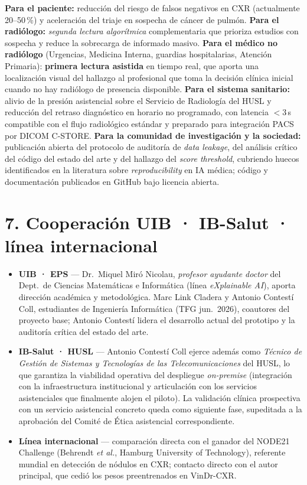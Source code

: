 \documentclass[11pt,a4paper]{article}
\begin{document}
\textbf{Para el paciente:} reducción del riesgo de falsos negativos en CXR (actualmente 20--50\,\%) y aceleración del triaje en sospecha de cáncer de pulmón. \textbf{Para el radiólogo:} \emph{segunda lectura algorítmica} complementaria que prioriza estudios con sospecha y reduce la sobrecarga de informado masivo. \textbf{Para el médico no radiólogo} (Urgencias, Medicina Interna, guardias hospitalarias, Atención Primaria): \textbf{primera lectura asistida} en tiempo real, que aporta una localización visual del hallazgo al profesional que toma la decisión clínica inicial cuando no hay radiólogo de presencia disponible. \textbf{Para el sistema sanitario:} alivio de la presión asistencial sobre el Servicio de Radiología del HUSL y reducción del retraso diagnóstico en horario no programado, con latencia $<$3\,s compatible con el flujo radiológico estándar y preparado para integración PACS por DICOM C-STORE. \textbf{Para la comunidad de investigación y la sociedad:} publicación abierta del protocolo de auditoría de \emph{data leakage}, del análisis crítico del código del estado del arte y del hallazgo del \emph{score threshold}, cubriendo huecos identificados en la literatura sobre \emph{reproducibility} en IA médica; código y documentación publicados en GitHub bajo licencia abierta.

\section*{7. Cooperación UIB · IB-Salut · línea internacional}

\begin{itemize}[leftmargin=1.2em, itemsep=1pt, topsep=1pt]
\item \textbf{UIB · EPS} --- Dr.~Miquel Miró Nicolau, \emph{profesor ayudante doctor} del Dept.\ de Ciencias Matemáticas e Informática (línea \emph{eXplainable AI}), aporta dirección académica y metodológica. Marc Link Cladera y Antonio Contestí Coll, estudiantes de Ingeniería Informática (TFG jun.\ 2026), coautores del proyecto base; Antonio Contestí lidera el desarrollo actual del prototipo y la auditoría crítica del estado del arte.
\item \textbf{IB-Salut · HUSL} --- Antonio Contestí Coll ejerce además como \emph{Técnico de Gestión de Sistemas y Tecnologías de las Telecomunicaciones} del HUSL, lo que garantiza la viabilidad operativa del despliegue \emph{on-premise} (integración con la infraestructura institucional y articulación con los servicios asistenciales que finalmente alojen el piloto). La validación clínica prospectiva con un servicio asistencial concreto queda como siguiente fase, supeditada a la aprobación del Comité de Ética asistencial correspondiente.
\item \textbf{Línea internacional} --- comparación directa con el ganador del NODE21 Challenge (Behrendt \emph{et al.}, Hamburg University of Technology), referente mundial en detección de nódulos en CXR; contacto directo con el autor principal, que cedió los pesos preentrenados en VinDr-CXR.
\end{itemize}
\end{document}
